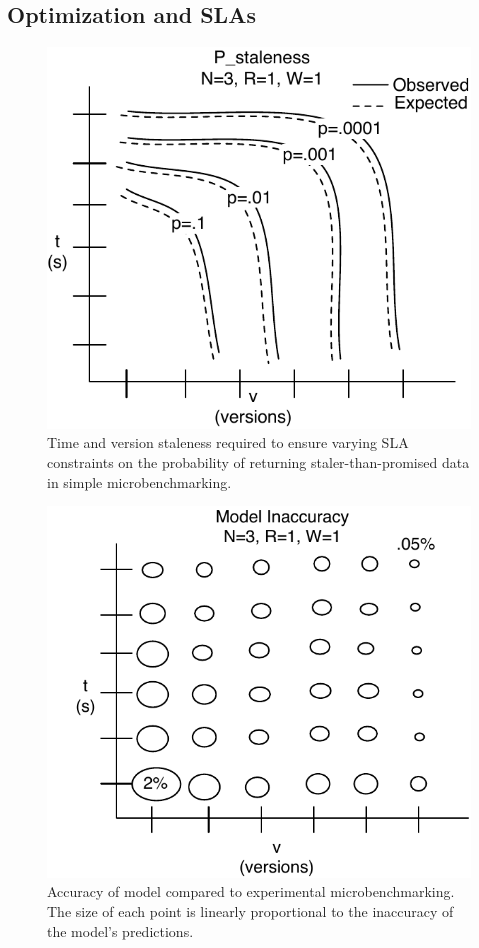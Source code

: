 \documentclass{vldb}
\begin{document}
\subsection{Optimization and SLAs}
\label{sec:optimization}

\begin{figure}
\centering
\includegraphics[width=.8\columnwidth]{figs/bothdimensions.pdf}
\caption{Time and version staleness required to ensure varying SLA constraints on the probability of returning staler-than-promised data in simple microbenchmarking.}
\label{fig:prob-staler}
\end{figure}

\begin{figure}
\centering
\includegraphics[width=.8\columnwidth]{figs/inaccuracy.pdf}
\caption{Accuracy of model compared to experimental microbenchmarking.
  The size of each point is linearly proportional to the inaccuracy of
  the model's predictions.}
\label{fig:prob-staler}
\end{figure}
\end{document}
